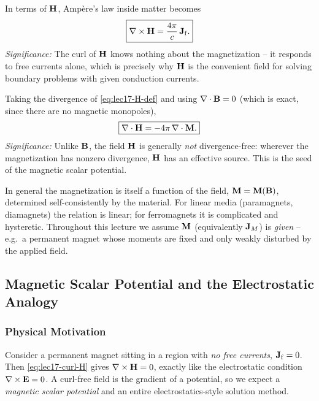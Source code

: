 In terms of $\mathbf{H}$, Amp\`ere's law inside matter becomes
\begin{equation}\label{eq:lec17-curl-H}
  \boxed{\nabla\times\mathbf{H}=\frac{4\pi}{c}\,\mathbf{J}_{\rm f}.}
\end{equation}
\textit{Significance:} The curl of $\mathbf{H}$ knows nothing about the magnetization -- it
responds to free currents alone, which is precisely why $\mathbf{H}$ is the convenient field
for solving boundary problems with given conduction currents.

Taking the divergence of \eqref{eq:lec17-H-def} and using $\nabla\cdot\mathbf{B}=0$
(which is exact, since there are no magnetic monopoles),
\begin{equation}\label{eq:lec17-div-H}
  \boxed{\nabla\cdot\mathbf{H}=-4\pi\,\nabla\cdot\mathbf{M}.}
\end{equation}
\textit{Significance:} Unlike $\mathbf{B}$, the field $\mathbf{H}$ is generally \emph{not}
divergence-free: wherever the magnetization has nonzero divergence, $\mathbf{H}$ has an
effective source.  This is the seed of the magnetic scalar potential.

\begin{remark}
  In general the magnetization is itself a function of the field, $\mathbf{M}=\mathbf{M}(\mathbf{B})$,
  determined self-consistently by the material.  For linear media (paramagnets,
  diamagnets) the relation is linear; for ferromagnets it is complicated and hysteretic.
  Throughout this lecture we assume $\mathbf{M}$ (equivalently $\mathbf{J}_M$) is \emph{given} --
  e.g.\ a permanent magnet whose moments are fixed and only weakly disturbed by the
  applied field.
\end{remark}

\subsection{Magnetic Scalar Potential and the Electrostatic Analogy}\label{subsec:lec17-scalar-potential}

\subsubsection*{Physical Motivation}
Consider a permanent magnet sitting in a region with \emph{no free currents},
$\mathbf{J}_{\rm f}=0$.  Then \eqref{eq:lec17-curl-H} gives $\nabla\times\mathbf{H}=0$, exactly
like the electrostatic condition $\nabla\times\mathbf{E}=0$.  A curl-free field is the gradient
of a potential, so we expect a \emph{magnetic scalar potential} and an entire
electrostatics-style solution method.

